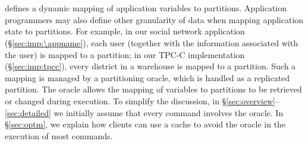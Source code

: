 \section{\dynastar}
\label{sec:dynastar}

%
%



\dynastar defines a dynamic mapping of application variables to partitions. Application programmers may also define other granularity of data when mapping application state to partitions. For example, in our social network application (\S\ref{sec:imp:\appname}), each user (together with the information associated with the user) is mapped to a partition; in our TPC-C implementation (\S\ref{sec:imp:tpcc}), every district in a warehouse is mapped to a partition.
Such a mapping is managed by a partitioning oracle, which is handled as a replicated partition.
The oracle allows the mapping of variables to partitions to be retrieved or changed during execution.
To simplify the discussion, in \S\ref{sec:overview}--\ref{sec:detailed} we initially assume that every command involves the oracle.
In \S\ref{sec:optm}, we explain how clients can use a cache to avoid the oracle in the execution of most commands.

